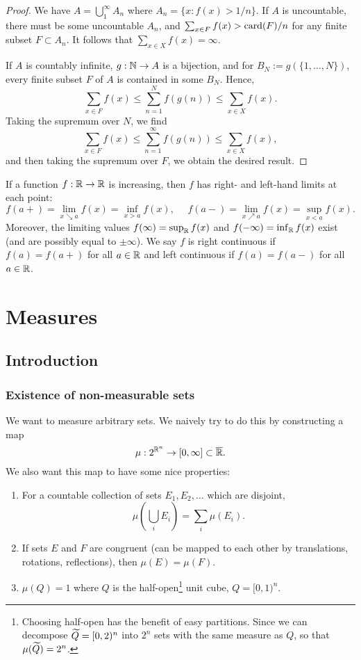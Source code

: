 \documentclass[12pt]{article} %
\begin{document}
\begin{proof}
    We have $A = \bigcup_{1}^{\infty} A_n$ where $A_n = \{x : f(x) > 1/n\}$. If $A$ is uncountable, there must be some uncountable $A_n$, and $\sum_{x \in F}f(x) > \operatorname{card}(F) / n$ for any finite subset $F \subset A_n$. It follows that $\sum_{x \in X}f(x) = \infty$.

    If $A$ is countably infinite, $g : \mathbb{N} \to A$ is a bijection, and for $B_N := g(\{1, \ldots, N\})$, every finite subset $F$ of $A$ is contained in some $B_N$. Hence, \[\sum_{x \in F} f(x) \leq \sum_{n=1}^{N} f(g(n)) \leq \sum_{x \in X} f(x).\] Taking the supremum over $N$, we find \[\sum_{x \in F} f(x) \leq \sum_{n=1}^{\infty} f(g(n)) \leq \sum_{x \in X} f(x),\] and then taking the supremum over $F$, we obtain the desired result.
\end{proof}

If a function $f : \mathbb{R} \to \mathbb{R}$ is increasing, then $f$ has right- and left-hand limits at each point: \[f(a+) = \lim_{x \searrow a} f(x) = \inf_{x > a} f(x), \ \ \ \ \ \ f(a-) = \lim_{x \nearrow a} f(x) = \sup_{x < a} f(x).\] Moreover, the limiting values $f(\infty) = \sup_{\mathbb{R}} f(x)$ and $f(-\infty) = \inf_{\mathbb{R}} f(x)$ exist (and are possibly equal to $\pm \infty$). We say $f$ is right continuous if $f(a) = f(a+)$ for all $a \in \mathbb{R}$ and left continuous if $f(a) = f(a-)$ for all $a \in \mathbb{R}$.

\section{Measures}

\subsection{Introduction}

\subsubsection{Existence of non-measurable sets}

We want to measure arbitrary sets. We naively try to do this by constructing a map \[\mu : 2^{\mathbb{R}^n} \to [0, \infty] \subset \overline{\mathbb{R}}.\] We also want this map to have some nice properties: \begin{enumerate}
    \item For a countable collection of sets $E_1, E_2, \ldots$ which are disjoint, \[\mu\left( \bigcup_{i}E_i \right) = \sum_i \mu(E_i).\]
    \item If sets $E$ and $F$ are congruent (can be mapped to each other by translations, rotations, reflections), then $\mu(E) = \mu(F)$.
    \item $\mu(Q) = 1$ where $Q$ is the half-open\footnote{Choosing half-open has the benefit of easy partitions. Since we can decompose $\widetilde{Q} = [0,2)^n$ into $2^n$ sets with the same measure as $Q$, so that $\mu(\widetilde{Q}) = 2^n$.} unit cube, $Q = [0, 1)^n$.
\end{enumerate}
\end{document}
